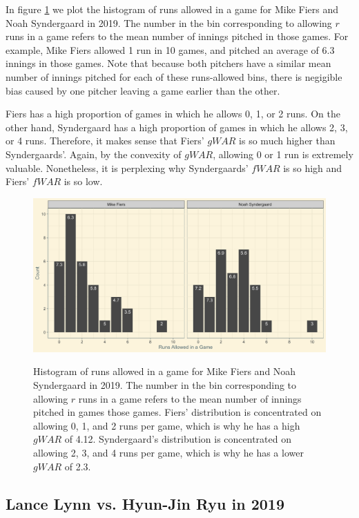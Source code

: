\documentclass[12pt]{article}
\begin{document}
In figure \ref{fig:cumRunsFiersSynderg} we plot the histogram of runs allowed in a game for Mike Fiers and Noah Syndergaard in 2019. The number in the bin corresponding to allowing $r$ runs in a game refers to the mean number of innings pitched in those games. For example, Mike Fiers allowed 1 run in 10 games, and pitched an average of 6.3 innings in those games. Note that because both pitchers have a similar mean number of innings pitched for each of these runs-allowed bins, there is negigible bias caused by one pitcher leaving a game earlier than the other. 

Fiers has a high proportion of games in which he allows 0, 1, or 2 runs. On the other hand, Syndergaard has a high proportion of games in which he allows 2, 3, or 4 runs. Therefore, it makes sense that Fiers' $gWAR$ is so much higher than Syndergaards'. Again, by the convexity of $gWAR$, allowing 0 or 1 run is extremely valuable. Nonetheless, it is perplexing why Syndergaards' $fWAR$ is so high and Fiers' $fWAR$ is so low. 


\begin{figure}[t!]
\centering
\caption{Histogram of runs allowed in a game for Mike Fiers and Noah Syndergaard in 2019. The number in the bin corresponding to allowing $r$ runs in a game refers to the mean number of innings pitched in games those games. Fiers' distribution is concentrated on allowing 0, 1, and 2 runs per game, which is why he has a high $gWAR$ of 4.12. Syndergaard's distribution is concentrated on allowing 2, 3, and 4 runs per game, which is why he has a lower $gWAR$ of 2.3.} 
\includegraphics[width=15cm]{../writeup_plots/plot_Fiers_Synderg_2019.png}
\label{fig:cumRunsFiersSynderg}
\end{figure}

\subsection{Lance Lynn vs. Hyun-Jin Ryu in 2019}
\end{document}
